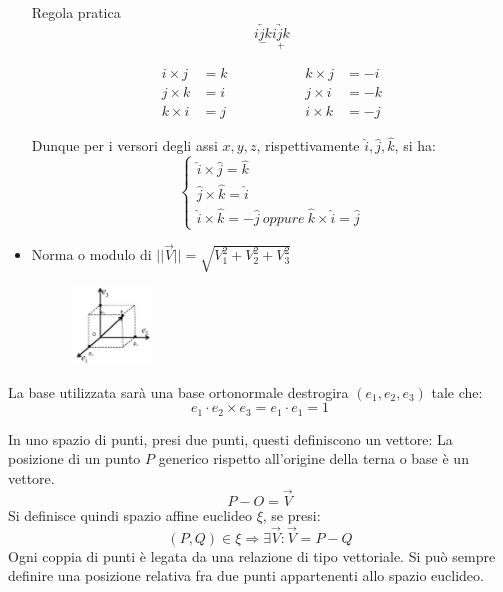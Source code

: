\documentclass{article}
\begin{document}
\begin{adjustwidth}{2in}{}
\begin{itemize}
		Regola pratica 
		\[\underset{-}{\underleftarrow{ijk}}\underset{+}{\underrightarrow{ijk}}\]
		
		\[ \begin{aligned}
			i \times j & = k \\
			j \times k & = i \\
			k \times i & = j
		\end{aligned} \hspace{2cm} \begin{aligned}
		k \times j & = -i \\
		j \times i & = -k \\
		i \times k & = -j
	\end{aligned} \]
	
	Dunque per i versori degli assi $x,y,z$, rispettivamente $\hat{i}, \hat{j}, \hat{k}$, si ha: 
	\[
	\begin{cases}
		\hat{i}\times\hat{j}=\hat{k} \\
		\hat{j}\times\hat{k}=\hat{i} \\
		\hat{i}\times\hat{k}=-\hat{j} ~ oppure ~ \hat{k}\times\hat{i}=\hat{j}
	\end{cases}
	\]
		
\item Norma o modulo di $|| \vec{V} ||=\sqrt{V_{1}^2 + V_{2}^2 +V_{3}^2}$ \newline
\begin{figure}[H]
			\centering
						\includegraphics[width=0.2\textwidth]{"immagini/1.PARTE1_Pagina_03"}			
\end{figure}
\end{itemize}
		La base utilizzata sarà una base ortonormale destrogira $(e_{1},e_{2},e_{3})$ tale che:
		\[e_{1} \cdot e_{2} \times e_{3}= e_{1} \cdot e_{1}  =  1\]  
		
	In uno spazio di punti, presi due punti, questi definiscono un vettore:\newline 
	La posizione di un punto $P$ generico rispetto all'origine della terna o base è un vettore.
		\[P-O=\vec{V}\] 
		Si definisce quindi spazio affine euclideo $\xi$, se presi:
		\[(P,Q)\in \xi \Rightarrow \exists \vec{V}: \vec{V}=P-Q\]
		Ogni coppia di punti è legata da una relazione di tipo vettoriale. \newline
		Si può sempre definire una posizione relativa fra due punti appartenenti allo spazio euclideo. \newline
		


\end{adjustwidth}
\end{document}
